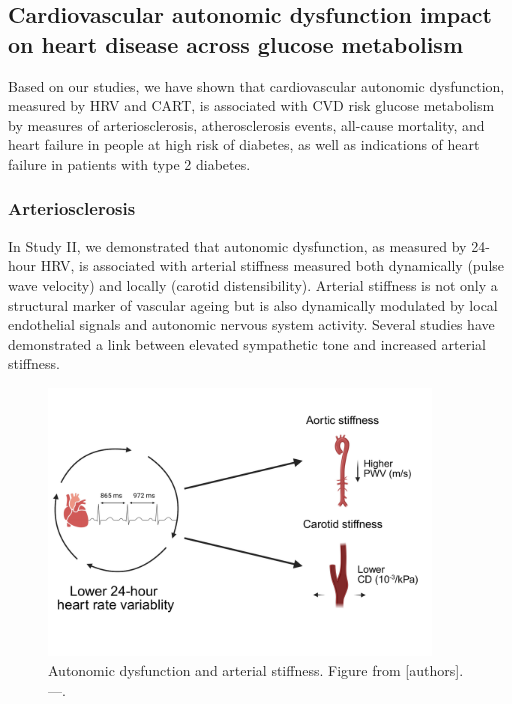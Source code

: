 \documentclass[
  a4paper,
  headsepline=true,
  open=any]{scrbook}
\begin{document}
\hypertarget{cardiovascular-autonomic-dysfunction-impact-on-heart-disease-across-glucose-metabolism}{%
\subsection{Cardiovascular autonomic dysfunction impact on heart disease
across glucose
metabolism}\label{cardiovascular-autonomic-dysfunction-impact-on-heart-disease-across-glucose-metabolism}}

Based on our studies, we have shown that cardiovascular autonomic
dysfunction, measured by HRV and CART, is associated with CVD risk
glucose metabolism by measures of arteriosclerosis, atherosclerosis
events, all-cause mortality, and heart failure in people at high risk of
diabetes, as well as indications of heart failure in patients with type
2 diabetes.

\hypertarget{arteriosclerosis-1}{%
\subsubsection{Arteriosclerosis}\label{arteriosclerosis-1}}

In Study II, we demonstrated that autonomic dysfunction, as measured by
24-hour HRV, is associated with arterial stiffness measured both
dynamically (pulse wave velocity) and locally (carotid distensibility).
Arterial stiffness is not only a structural marker of vascular ageing
but is also dynamically modulated by local endothelial signals and
autonomic nervous system activity. Several studies have demonstrated a
link between elevated sympathetic tone and increased arterial stiffness.

\begin{figure}

{\centering \includegraphics[width=4in,height=\textheight]{images/hrv_arterial_stiffness.pdf}

}

\caption{Autonomic dysfunction and arterial stiffness. Figure from
{[}authors{]}. ---.}

\end{figure}
\end{document}
